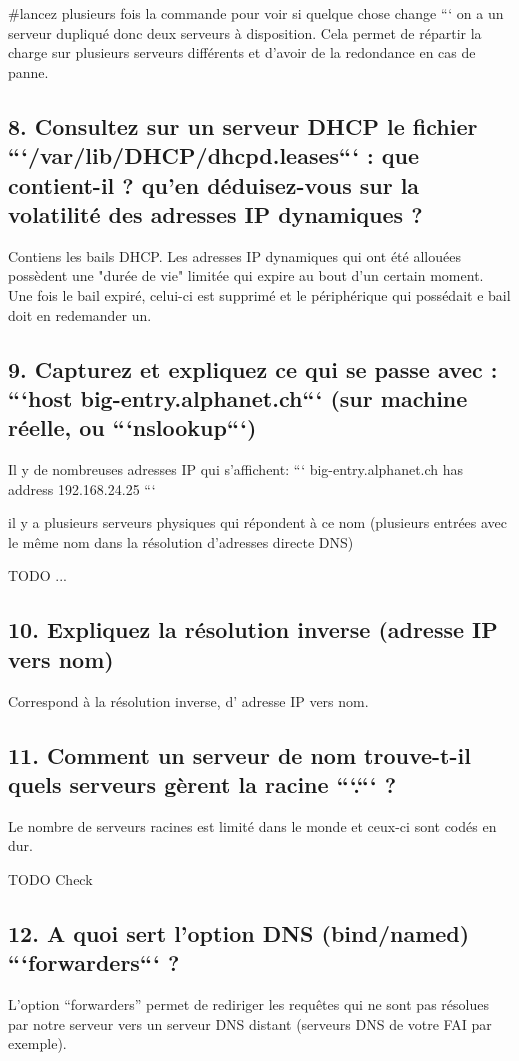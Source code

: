 \documentclass{article}
\begin{document}
\#lancez plusieurs fois la commande pour voir si quelque chose change
```
on a un serveur dupliqué donc deux serveurs à disposition. Cela permet de répartir la charge sur plusieurs serveurs différents et d'avoir de la redondance en cas de panne.

\subsection*{8. Consultez sur un serveur DHCP le fichier ```/var/lib/DHCP/dhcpd.leases``` : que contient-il ? qu’en déduisez-vous sur la volatilité des adresses IP dynamiques ?}
Contiens les bails DHCP. Les adresses IP dynamiques qui ont été allouées possèdent une "durée de vie" limitée qui expire au bout d'un certain moment. Une fois le bail expiré, celui-ci est supprimé et le périphérique qui possédait e bail doit en redemander un.

\subsection*{9. Capturez et expliquez ce qui se passe avec : ```host big-entry.alphanet.ch``` (sur machine réelle, ou ```nslookup```)}
Il y de nombreuses adresses IP qui s'affichent:
```
big-entry.alphanet.ch has address 192.168.24.25
```

il y a plusieurs serveurs physiques qui répondent à ce nom (plusieurs entrées avec le même nom dans la résolution d'adresses directe DNS)

TODO ...

\subsection*{10. Expliquez la résolution inverse (adresse IP vers nom)}
Correspond à la résolution inverse, d’ adresse IP vers nom.

\subsection*{11. Comment un serveur de nom trouve-t-il quels serveurs gèrent la racine ```.``` ?}
Le nombre de serveurs racines est limité dans le monde et ceux-ci sont codés en dur.

TODO Check

\subsection*{12. A quoi sert l’option DNS (bind/named) ```forwarders``` ?}
L'option “forwarders” permet de rediriger les requêtes qui ne sont pas résolues par notre serveur vers un serveur DNS distant (serveurs DNS de votre FAI par exemple).
\end{document}
